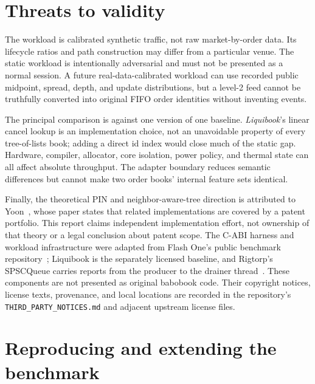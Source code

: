 \documentclass[10pt,twocolumn]{article}
\begin{document}
\section{Threats to validity}

The workload is calibrated synthetic traffic, not raw market-by-order data.
Its lifecycle ratios and path construction may differ from a particular venue.
The static workload is intentionally adversarial and must not be presented as a
normal session.  A future real-data-calibrated workload can use recorded public
midpoint, spread, depth, and update distributions, but a level-2 feed cannot be
truthfully converted into original FIFO order identities without inventing
events.

The principal comparison is against one version of one baseline.  \textit{Liquibook}'s
linear cancel lookup is an implementation choice, not an unavoidable property
of every tree-of-lists book; adding a direct id index would close much of the
static gap.  Hardware, compiler, allocator, core isolation, power policy, and
thermal state can all affect absolute throughput.  The adapter boundary reduces
semantic differences but cannot make two order books' internal feature sets
identical.

Finally, the theoretical PIN and neighbor-aware-tree direction is attributed to
Yoon~\cite{yoon2026}, whose paper states that related implementations are covered by a patent
portfolio.  This report claims independent implementation effort, not ownership
of that theory or a legal conclusion about patent scope.  The C-ABI harness and
workload infrastructure were adapted from Flash One's public benchmark
repository~\cite{flashbenchmark}; Liquibook is the separately licensed baseline,
and Rigtorp's SPSCQueue carries reports from the producer to the drainer
thread~\cite{rigtorp}.  These components are not presented as original babobook
code.  Their copyright notices, license texts, provenance, and local locations
are recorded in the repository's \texttt{THIRD\_PARTY\_NOTICES.md} and adjacent
upstream license files.

\section{Reproducing and extending the benchmark}
\end{document}
